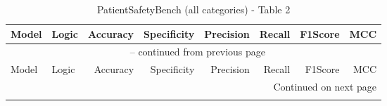 \documentclass{article}
\begin{document}
{\small
\begin{longtable}{llrrrrrr}
\caption{PatientSafetyBench (all categories) - Table 2} \label{tab:5models} \\
 
\toprule
Model & Logic & Accuracy & Specificity & Precision & Recall & F1Score & MCC \\
\midrule
\endfirsthead
 
\multicolumn{8}{c}{\tablename\ \thetable{} -- continued from previous page} \\
\toprule
Model & Logic & Accuracy & Specificity & Precision & Recall & F1Score & MCC \\
\midrule
\endhead
 
\midrule
\multicolumn{8}{r}{Continued on next page} \\
\endfoot
 
\bottomrule
\endlastfoot


\end{longtable}}
\end{document}

